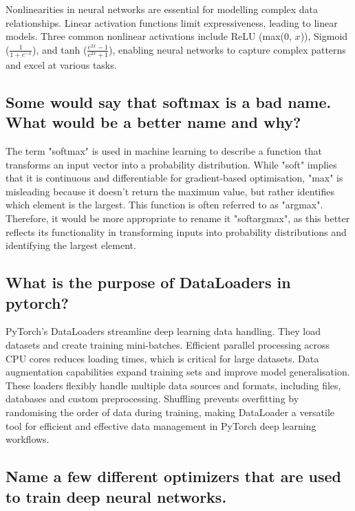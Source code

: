 \documentclass{article}
\begin{document}
Nonlinearities in neural networks are essential for modelling complex data relationships.
Linear activation functions limit expressiveness, leading to linear models.
Three common nonlinear activations include ReLU (max(0, $x$)), Sigmoid ($\tfrac{1}{1 + e^{-x}}$), and tanh ($\tfrac{e^{2x}-1}{e^{2x}+1}$), enabling neural networks to capture complex patterns and excel at various tasks.


\subsection{Some would say that softmax is a bad name. What would be a better name and why?}

The term "softmax" is used in machine learning to describe a function that transforms an input vector into a probability distribution.
While "soft" implies that it is continuous and differentiable for gradient-based optimisation, "max" is misleading because it doesn't return the maximum value, but rather identifies which element is the largest.
This function is often referred to as "argmax".
Therefore, it would be more appropriate to rename it "softargmax", as this better reflects its functionality in transforming inputs into probability distributions and identifying the largest element.


\subsection{What is the purpose of DataLoaders in pytorch?}

PyTorch's DataLoaders streamline deep learning data handling.
They load datasets and create training mini-batches.
Efficient parallel processing across CPU cores reduces loading times, which is critical for large datasets.
Data augmentation capabilities expand training sets and improve model generalisation.
These loaders flexibly handle multiple data sources and formats, including files, databases and custom preprocessing.
Shuffling prevents overfitting by randomising the order of data during training, making DataLoader a versatile tool for efficient and effective data management in PyTorch deep learning workflows.


\subsection{Name a few different optimizers that are used to train deep neural networks.}
\end{document}
